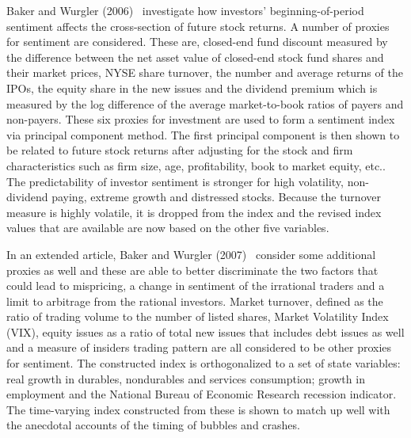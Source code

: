  
 Baker and Wurgler (2006)~\cite{baker2006investor} investigate how investors' beginning-of-period sentiment affects the cross-section of future stock returns. A number of proxies for sentiment are considered. These are, closed-end fund discount measured by the difference between the net asset value of closed-end stock fund shares and their market prices, NYSE share turnover, the number and average returns of the IPOs, the equity share in the new issues and the dividend premium which is measured by the log difference of the average market-to-book ratios of payers and non-payers. These six proxies for investment are used to form a sentiment index via principal component method. The first principal component is then shown to be related to future stock returns after adjusting for the stock and firm characteristics such as firm size, age, profitability, book to market equity, etc.. The predictability of investor sentiment is stronger for high volatility, non-dividend paying, extreme growth and distressed stocks. Because the turnover measure is highly volatile, it is dropped from the index and the revised index values that are available are now based on the other five variables. 
 
 
In an extended article, Baker and Wurgler (2007)~\cite{baker2007investor} consider some additional proxies as well and these are able to better discriminate the two factors that could lead to mispricing, a change in sentiment of the irrational traders and a limit to arbitrage from the rational investors. Market turnover, defined as the ratio of trading volume to the number of listed shares, Market Volatility Index (VIX), equity issues as a ratio of total new issues that includes debt issues as well and a measure of insiders trading pattern are all considered to be other proxies for sentiment. The constructed index is orthogonalized to a set of state variables: real growth in durables, nondurables and services consumption; growth in employment and the National Bureau of Economic Research recession indicator. The time-varying index constructed from these is shown to match up well with the anecdotal accounts of the timing of bubbles and crashes.
 
